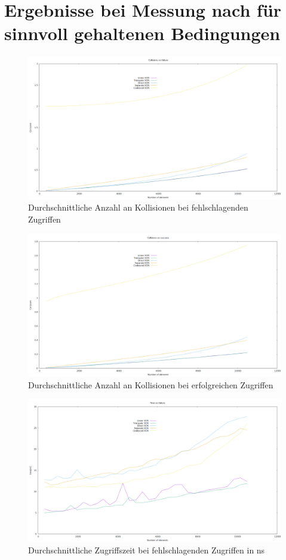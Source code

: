 \section{Ergebnisse bei Messung nach für sinnvoll gehaltenen Bedingungen}
\begin{figure}[h!]
    \includegraphics[width=0.7\paperwidth]{Bilder/failure_collisions_part.png}
    \caption{Durchschnittliche Anzahl an Kollisionen bei fehlschlagenden Zugriffen}
\end{figure}
\begin{figure}[h!]
    \includegraphics[width=0.7\paperwidth]{Bilder/successful_collisions_part.png}
    \caption{Durchschnittliche Anzahl an Kollisionen bei erfolgreichen Zugriffen}
\end{figure}
\begin{figure}[h!]
    \includegraphics[width=0.7\paperwidth]{Bilder/failure_time_part.png}
    \caption{Durchschnittliche Zugriffszeit bei fehlschlagenden Zugriffen in ns}
\end{figure}
